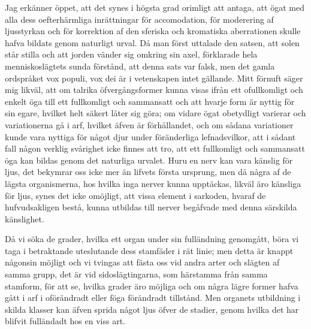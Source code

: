 Jag erkänner öppet, att det synes i högsta grad orimligt att antaga, att ögat med alla dess oefterhärmliga inrättningar för accomodation, för moderering af ljusstyrkan och för korrektion af den sferiska och kromatiska aberrationen skulle hafva bildats genom naturligt urval. Då man först uttalade den satsen, att solen står stilla och att jorden vänder sig omkring sin axel, förklarade hela menniskoslägtets sunda förstånd, att denna sats var falsk, men det gamla ordspråket vox populi, vox dei är i vetenskapen intet gällande. Mitt förnuft säger mig likväl, att om talrika öfvergångsformer kunna visas ifrån ett ofullkomligt och enkelt öga till ett fullkomligt och sammansatt och att hvarje form är nyttig för sin egare, hvilket helt säkert låter sig göra; om vidare ögat obetydligt varierar och variationerna gå i arf, hvilket äfven är förhållandet, och om sådana variationer kunde vara nyttiga för något djur under föränderliga lefnadsvilkor, att i sådant fall någon verklig svårighet icke finnes att tro, att ett fullkomligt och sammansatt öga kan bildas genom det naturliga urvalet. Huru en nerv kan vara känslig för ljus, det bekymrar oss icke mer än lifvets första ursprung, men då några af de lägsta organismerna, hos hvilka inga nerver kunna upptäckas, likväl äro känsliga för ljus, synes det icke omöjligt, att vissa element i sarkoden, hvaraf de hufvudsakligen bestå, kunna utbildas till nerver begåfvade med denna särskilda känslighet.

Då vi söka de grader, hvilka ett organ under sin fulländning genomgått, böra vi taga i betraktande uteslutande dess stamfäder i rät linie; men detta är knappt någonsin möjligt och vi tvingas att fästa oss vid andra arter och slägten af samma grupp, det är vid sidoslägtingarna, som härstamma från samma stamform, för att se, hvilka grader äro möjliga och om några lägre former hafva gått i arf i oförändradt eller föga förändradt tillstånd. Men organets utbildning i skilda klasser kan äfven sprida något ljus öfver de stadier, genom hvilka det har blifvit fulländadt hos en viss art.


